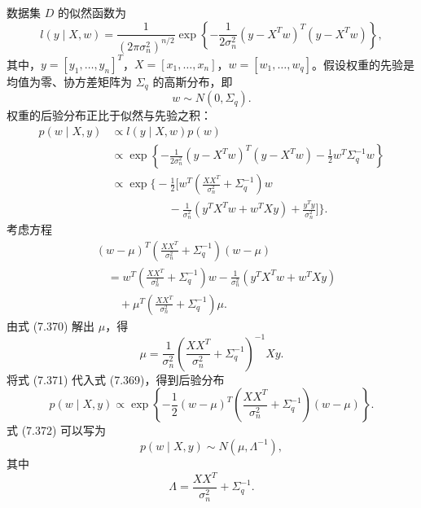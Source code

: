 数据集 $D$ 的似然函数为
\begin{equation}
l(y\mid X,w)=\frac1{(2\pi\sigma_n^2)^{n/2}}
\exp\left\{-\frac1{2\sigma_n^2}(y-X^Tw)^T(y-X^Tw)\right\},
\tag{7.367}
\end{equation}
其中，$y=[y_1,\ldots,y_n]^T$，$X=[x_1,\ldots,x_n]$，$w=[w_1,\ldots,w_q]$。假设权重的先验是均值为零、协方差矩阵为 $\Sigma_q$ 的高斯分布，即
\begin{equation}
w\sim N(0,\Sigma_q).
\tag{7.368}
\end{equation}
权重的后验分布正比于似然与先验之积：
\begin{equation}
\begin{aligned}
p(w\mid X,y)&\propto l(y\mid X,w)p(w)\\
&\propto\exp\left\{-\frac1{2\sigma_n^2}(y-X^Tw)^T(y-X^Tw)-\frac12w^T\Sigma_q^{-1}w\right\}\\
&\propto\exp\Biggl\{-\frac12\Biggl[w^T\left(\frac{XX^T}{\sigma_n^2}+\Sigma_q^{-1}\right)w\\
&\hspace{5em}-\frac1{\sigma_n^2}(y^TX^Tw+w^TXy)+\frac{y^Ty}{\sigma_n^2}\Biggr]\Biggr\}.
\end{aligned}
\tag{7.369}
\end{equation}
考虑方程
\begin{equation}
\begin{aligned}
&(w-\mu)^T\left(\frac{XX^T}{\sigma_n^2}+\Sigma_q^{-1}\right)(w-\mu)\\
&\quad=w^T\left(\frac{XX^T}{\sigma_n^2}+\Sigma_q^{-1}\right)w
-\frac1{\sigma_n^2}(y^TX^Tw+w^TXy)\\
&\qquad+\mu^T\left(\frac{XX^T}{\sigma_n^2}+\Sigma_q^{-1}\right)\mu.
\end{aligned}
\tag{7.370}
\end{equation}
由式 (7.370) 解出 $\mu$，得
\begin{equation}
\mu=\frac1{\sigma_n^2}\left(\frac{XX^T}{\sigma_n^2}+\Sigma_q^{-1}\right)^{-1}Xy.
\tag{7.371}
\end{equation}
将式 (7.371) 代入式 (7.369)，得到后验分布
\begin{equation}
p(w\mid X,y)\propto\exp\left\{-\frac12(w-\mu)^T
\left(\frac{XX^T}{\sigma_n^2}+\Sigma_q^{-1}\right)(w-\mu)\right\}.
\tag{7.372}
\end{equation}
式 (7.372) 可以写为
\begin{equation}
p(w\mid X,y)\sim N(\mu,\Lambda^{-1}),
\tag{7.373}
\end{equation}
其中
\begin{equation}
\Lambda=\frac{XX^T}{\sigma_n^2}+\Sigma_q^{-1}.
\tag{7.374}
\end{equation}

